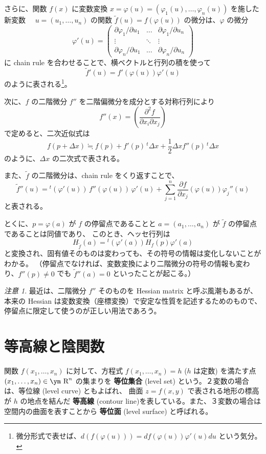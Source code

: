\documentclass[a4paper]{jsarticle}
\theoremstyle{definition}
\theoremstyle{remark}
\newtheorem{Remark}{注意}
\newcommand{\R}{\text{\ym R}}
\begin{document}
さらに、関数 $f(x)$ に変数変換 $x = \varphi(u) = (\varphi_1(u),\dots,\varphi_n(u))$ 
を施した新変数　 $u = (u_1,\dots,u_n)$ の関数 $\widetilde f(u) = f(\varphi(u))$ の微分は、$\varphi$ の微分
\[
  \varphi'(u) =
  \begin{pmatrix}
    \partial\varphi_1/\partial u_1 & \dots & \partial\varphi_1/\partial u_n\\
    \vdots & \ddots &\vdots\\
    \partial\varphi_n/\partial u_1 & \dots & \partial\varphi_n/\partial u_n
  \end{pmatrix}
\]
に chain rule を合わせることで、横ベクトルと行列の積を使って
\[
  {\widetilde f}'(u) = f'(\varphi(u)) \varphi'(u)
\]
のように表される\footnote{微分形式で表せば、$d (f(\varphi(u))) = df(\varphi(u)) \varphi'(u)du$ という気分。}。

次に、$f$ の二階微分 $f''$ を二階偏微分を成分とする対称行列により
\[
  f''(x) = \left( \frac{\partial^2 f}{\partial x_i \partial x_j} \right) 
\]
で定めると、二次近似式は 
\[
  f(p+\Delta x) \fallingdotseq f(p) + f'(p)\,{}^t\Delta x + \frac{1}{2} \Delta x f''(p) \, {}^t\Delta x
\]
のように、$\Delta x$ の二次式で表される。

また、$\widetilde f$ の二階微分は、chain rule をくり返すことで、
\[
  {\widetilde f}''(u) = {}^t (\varphi'(u))\, f''(\varphi(u))\, \varphi'(u) +
  \sum_{j=1}^n \frac{\partial f}{\partial x_j}(\varphi(u)) \varphi_j''(u)
\]
と表される。

とくに、$p = \varphi(a)$ が $f$ の停留点であることと $a = (a_1,\dots,a_n)$ が $\widetilde f$ の停留点であることは同値であり、
このとき、ヘッセ行列は
\[
  H_{\widetilde f}(a) = {}^t (\varphi'(a)) H_f(p) \varphi'(a)
\]
と変換され、固有値そのものは変わっても、その符号の情報は変化しないことがわかる。
（停留点でなければ、変数変換により二階微分の符号の情報も変わり、$f''(p) \not= 0$ でも ${\widetilde f}''(a) = 0$ といったことが起こる。）

\begin{Remark}
  最近は、二階微分 $f''$ そのものを Hessian matrix と呼ぶ風潮もあるが、本来の Hessian は変数変換（座標変換）で安定な性質を記述するためのもので、
  停留点に限定して使うのが正しい用法であろう。
\end{Remark}

\bigskip
\section{等高線と陰関数}
関数 $f(x_1,\dots, x_n)$ に対して、方程式 
$f(x_1,\dots, x_n) = h$ ($h$ は定数) を満たす点 $(x_1, \dots, x_n) \in \R^n$ の集まりを
\textbf{等位集合} (level set) という。２変数の場合は、等位線 (level curve) ともよばれ、
曲面 $z = f(x,y)$ で表される地形の標高が $h$ の地点を結んだ
{\bf 等高線} (contour line)を表している。また、３変数の場合は空間内の曲面を表すことから
\textbf{等位面} (level surface) と呼ばれる。
\end{document}
